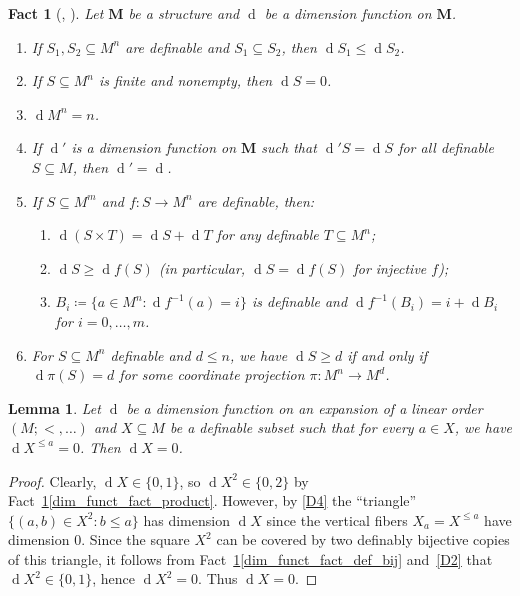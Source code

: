 \documentclass[11pt]{amsart}
\theoremstyle{plain}
\newtheorem{lemma}[thm]{Lemma}
\newtheorem{fact}[thm]{Fact}
\theoremstyle{definition}
\numberwithin{equation}{section}
\newcommand\0{\varnothing}
\renewcommand\d{\operatorname{d}}
\begin{document}
\begin{fact}[{\cite[1.1, 1.3, 1.5]{vdD89}}, {\cite[2.2]{angel2016bounded}}]\label{fact_vdD89}
Let $\bm{M}$ be a structure and $\d$ be a dimension function on $\bm{M}$.
\begin{enumerate}
    \item\label{dim_fact_subset} If $S_1,S_2\subseteq M^n$ are definable and $S_1\subseteq S_2$, then $\d S_1 \leq \d S_2$.
    \item If $S\subseteq M^n$ is finite and nonempty, then $\d S=0$.
    \item $\d M^n=n$.
    \item If $\d'$ is a dimension function on $\bm{M}$ such that $\d' S=\d S$ for all definable $S\subseteq M$, then $\d'=\d$.
    \item
    If $S \subseteq M^m$ and $f\colon S \to M^n$ are definable, then:
    \begin{enumerate}
        \item\label{dim_funct_fact_product} $\d(S\times T) = \d S+\d T$ for any definable $T \subseteq M^n$;
        \item\label{dim_funct_fact_def_bij} $\d S \geq \d f(S)$ (in particular, $\d S = \d f(S)$ for injective $f$);
        \item\label{dim_funct_fact_map_fibers} $B_i \coloneqq \{ a \in M^n : \d f^{-1}(a)=i \}$ is definable and $\d f^{-1}(B_i)=i+\d B_i$ for $i=0,\dots,m$.
    \end{enumerate}
    \item\label{dim_funct_fact_proj} For $S\subseteq M^n$ definable and $d \leq n$, we have $\d S\geq d$ if and only if $\d\pi(S) = d$ for some coordinate projection $\pi\colon M^n\to M^d$.
\end{enumerate}
\end{fact}





\begin{lemma}\label{dim_union_fact_linear_order}
Let $\operatorname{d}$ be a dimension function on an expansion of a linear order $(M;<,\ldots)$ and $X\subseteq M$ be a definable subset such that for every $a\in X$, we have $\operatorname{d}X^{\leq a}=0$. Then $\operatorname{d}X=0$.
\end{lemma}
\begin{proof}
Clearly, $\operatorname{d}X \in \{0,1\}$, so $\operatorname{d}X^2 \in \{0,2\}$ by Fact~\ref{fact_vdD89}\eqref{dim_funct_fact_product}. However, by \ref{D4} the ``triangle'' $\{(a,b)\in X^2:b\leq a\}$ has dimension $\d X$ since the vertical fibers $X_a=X^{\leq a}$ have dimension $0$. Since the square $X^2$ can be covered by two definably bijective copies of this triangle, it follows from Fact~\ref{fact_vdD89}\eqref{dim_funct_fact_def_bij} and~\ref{D2} that $\operatorname{d}X^2 \in \{0,1\}$, hence $\d X^2=0$. Thus $\operatorname{d}X=0$.
\end{proof}
\end{document}
